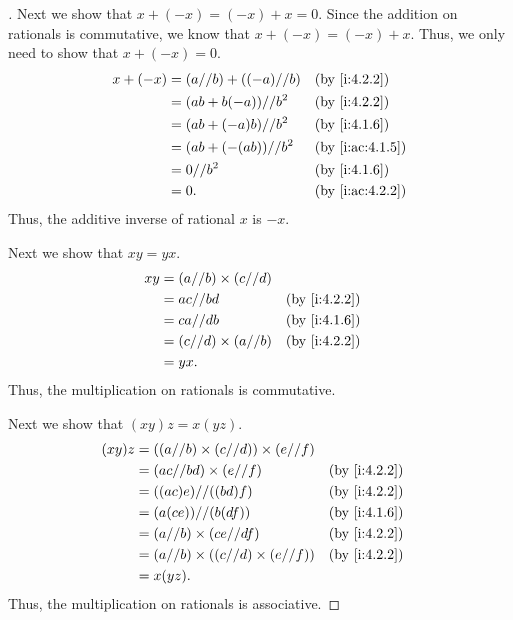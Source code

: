 \begin{proof}[]
  Next we show that \(x + (-x) = (-x) + x = 0\).
  Since the addition on rationals is commutative, we know that \(x + (-x) = (-x) + x\).
  Thus, we only need to show that \(x + (-x) = 0\).
  \begin{align*}
    x + (-x) & = (a // b) + ((-a) // b) &  & \by{i:4.2.2}    \\
             & = (ab + b(-a)) // b^2    &  & \by{i:4.2.2}    \\
             & = (ab + (-a)b) // b^2    &  & \by{i:4.1.6}    \\
             & = (ab + (-(ab)) // b^2   &  & \by{i:ac:4.1.5} \\
             & = 0 // b^2               &  & \by{i:4.1.6}    \\
             & = 0.                     &  & \by{i:ac:4.2.2}
  \end{align*}
  Thus, the additive inverse of rational \(x\) is \(-x\).

  Next we show that \(xy = yx\).
  \begin{align*}
    xy & = (a // b) \times (c // d)                   \\
       & = ac // bd                 &  & \by{i:4.2.2} \\
       & = ca // db                 &  & \by{i:4.1.6} \\
       & = (c // d) \times (a // b) &  & \by{i:4.2.2} \\
       & = yx.
  \end{align*}
  Thus, the multiplication on rationals is commutative.

  Next we show that \((xy)z = x(yz)\).
  \begin{align*}
    (xy)z & = ((a // b) \times (c // d)) \times (e // f)                   \\
          & = (ac // bd) \times (e // f)                 &  & \by{i:4.2.2} \\
          & = ((ac)e) // ((bd)f)                         &  & \by{i:4.2.2} \\
          & = (a(ce)) // (b(df))                         &  & \by{i:4.1.6} \\
          & = (a // b) \times (ce // df)                 &  & \by{i:4.2.2} \\
          & = (a // b) \times ((c // d) \times (e // f)) &  & \by{i:4.2.2} \\
          & = x(yz).
  \end{align*}
  Thus, the multiplication on rationals is associative.


\end{proof}
